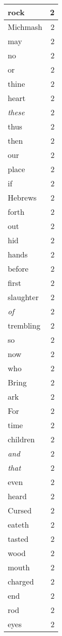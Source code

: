 \begin{center}
\begin{longtable}{l|r}
rock & 2 \\ \hline
Michmash & 2 \\ \hline
may & 2 \\ \hline
no & 2 \\ \hline
or & 2 \\ \hline
thine & 2 \\ \hline
heart & 2 \\ \hline
\emph{these} & 2 \\ \hline
thus & 2 \\ \hline
then & 2 \\ \hline
our & 2 \\ \hline
place & 2 \\ \hline
if & 2 \\ \hline
Hebrews & 2 \\ \hline
forth & 2 \\ \hline
out & 2 \\ \hline
hid & 2 \\ \hline
hands & 2 \\ \hline
before & 2 \\ \hline
first & 2 \\ \hline
slaughter & 2 \\ \hline
\emph{of} & 2 \\ \hline
trembling & 2 \\ \hline
so & 2 \\ \hline
now & 2 \\ \hline
who & 2 \\ \hline
Bring & 2 \\ \hline
ark & 2 \\ \hline
For & 2 \\ \hline
time & 2 \\ \hline
children & 2 \\ \hline
\emph{and} & 2 \\ \hline
\emph{that} & 2 \\ \hline
even & 2 \\ \hline
heard & 2 \\ \hline
Cursed & 2 \\ \hline
eateth & 2 \\ \hline
tasted & 2 \\ \hline
wood & 2 \\ \hline
mouth & 2 \\ \hline
charged & 2 \\ \hline
end & 2 \\ \hline
rod & 2 \\ \hline
eyes & 2 \\ \hline

\end{longtable}
\end{center}
